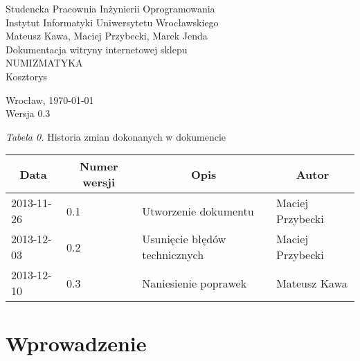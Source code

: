\documentclass 	[11pt, a4paper, leqno]	{article}					%
\begin{document}

\begin{center}
	\thispagestyle{empty} 							%
	{\large Studencka Pracownia Inżynierii Oprogramowania} 		\\ [0.5cm]
	{\large Instytut Informatyki Uniwersytetu Wrocławskiego} 	\\ [6.0cm]

	{\large Mateusz Kawa, Maciej Przybecki, Marek Jenda} 		\\ [1.5cm]

	{\huge Dokumentacja witryny internetowej sklepu} 			\\ [0.5cm]
	{\huge NUMIZMATYKA} 										\\ [1.5cm]

	{\large Kosztorys} 										\\ [0.5cm]

	\vfill
	
	{\large Wrocław, \today}									\\ [0.5cm]
	{\large Wersja 0.3}
\end{center}

\newpage


\textit{Tabela 0.} Historia zmian dokonanych w dokumencie

\begin{center}
	\begin{tabular}{| l | l | l | l |}
		\hline
		\multicolumn{1}{|c|}{Data} & 
		\multicolumn{1}{|c|}{Numer wersji} &  
		\multicolumn{1}{|c|}{Opis} &
		\multicolumn{1}{|c|}{Autor} \\ \hline \hline
		2013-11-26 & 0.1 & Utworzenie dokumentu & Maciej Przybecki \\ \hline
		2013-12-03 & 0.2 & Usunięcie błędów technicznych & Maciej Przybecki \\ \hline
		2013-12-10 & 0.3 & Naniesienie poprawek & Mateusz Kawa \\ \hline
	\end{tabular}
\end{center}
\medskip


\tableofcontents

\newpage

\section{Wprowadzenie}
\end{document}
